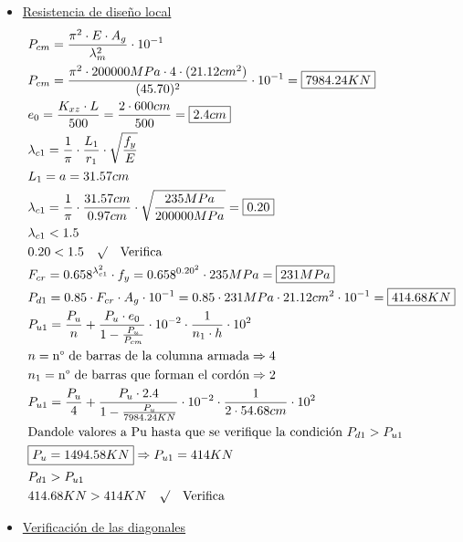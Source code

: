 \begin{itemize}
\item \underline{Resistencia de diseño local}
\begin{align*}
& P_{cm} = \frac{\pi^2 \cdot E \cdot A_g}{\lambda_m^2} \cdot 10^{-1}\\
& P_{cm} = \frac{\pi^2 \cdot 200000MPa \cdot 4 \cdot (21.12cm^2)}{(45.70)^2} \cdot 10^{-1} = \framebox{$7984.24KN$}\\
& e_0 = \frac{K_{xz} \cdot L}{500} = \frac{2 \cdot 600cm}{500} = \framebox{$2.4cm$} \\
& \lambda_{c1} = \frac{1}{\pi} \cdot \frac{L_1}{r_1} \cdot \sqrt{\frac{f_y}{E}} \\
& L_1 = a = 31.57cm \\
& \lambda_{c1} = \frac{1}{\pi} \cdot \frac{31.57cm}{0.97cm} \cdot \sqrt{\frac{235MPa}{200000MPa}} = \framebox{$0.20$} \\
& \lambda_{c1} < 1.5 \\
& 0.20 < 1.5 \quad \surd \quad \text{Verifica} \\
& F_{cr} = 0.658^{\lambda_{c1}^2} \cdot f_y = 0.658^{0.20^2} \cdot 235MPa = \framebox{$231MPa$}\\
& P_{d1} = 0.85 \cdot F_{cr} \cdot A_g \cdot 10^{-1} = 0.85 \cdot 231MPa \cdot 21.12cm^2 \cdot 10^{-1} = \framebox{$414.68KN$} \\
& P_{u1} = \frac{P_u}{n} + \frac{P_u \cdot e_0}{1-\frac{P_u}{P_{cm}}} \cdot 10^{-2} \cdot \frac{1}{n_1 \cdot h} \cdot 10^2 \\
& n = \text{n° de barras de la columna armada} \Rightarrow 4 \\
& n_1 = \text{n° de barras que forman el cordón} \Rightarrow 2 \\
& P_{u1} = \frac{P_u}{4} + \frac{P_u \cdot 2.4}{1-\frac{P_u}{7984.24KN}} \cdot 10^{-2} \cdot \frac{1}{2 \cdot 54.68cm} \cdot 10^2 \\
& \text{Dandole valores a Pu hasta que se verifique la condición } P_{d1} > P_{u1}\\
& \framebox{$P_u = 1494.58KN$} \Rightarrow P_{u1} = 414KN\\
& P_{d1} > P_{u1} \\
& 414.68KN > 414KN \quad \surd \quad \text{Verifica} \\
\end{align*}

\newpage
\item \underline{Verificación de las diagonales}


\end{itemize}
